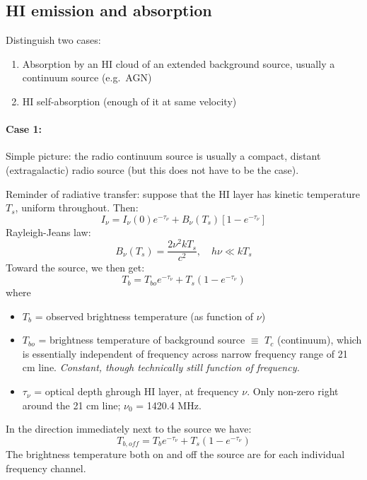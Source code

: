 \documentclass[12pt]{article}
\newcommand{\mar}[1]{\hspace{0pt}\marginpar{-\textcolor{black}{#1}-}}
\newcommand{\mynotes}[1]{{\fontfamily{cmss}\selectfont \textit{#1}}}
\begin{document}
\subsection{HI emission and absorption}
\mar{41}Distinguish two cases:
\begin{enumerate}
    \item Absorption by an HI cloud of an extended background source, usually
        a continuum source (e.g.\ AGN)
    \item HI self-absorption (enough of it at same velocity)
\end{enumerate}
\paragraph{Case 1:}
Simple picture: the radio continuum source is usually a compact, distant
(extragalactic) radio source (but this does not have to be the case).

Reminder of radiative transfer: suppose that the HI layer has kinetic
temperature $T_{s}$, uniform throughout. Then:
\[
    I_{\nu} = I_{\nu}(0)e^{-\tau_{\nu}}
    + B_{\nu} (T_{s}) \left[ 1 - e^{-\tau_{\nu}} \right]
    \]
Rayleigh-Jeans law:
\[
    B_{\nu} (T_{s}) = \frac{2\nu^{2}kT_{s}}{c^{2}}, \quad h\nu \ll kT_{s}
    \]
Toward the source, we then get:
\[
    T_{b} = T_{bo} e^{-\tau_{\nu}} + T_{s} \left( 1 - e^{-\tau_{\nu}} \right)
    \]
where
\begin{itemize}
    \item $T_{b}$ = observed brightness temperature (as function of $\nu$)
    \item $T_{bo}$ = brightness temperature of background source $\equiv$ $T_{c}$
        (continuum), which is essentially independent of frequency across narrow
        frequency range of 21 cm line. \mynotes{Constant, though technically still
        function of frequency.}
    \item $\tau_{\nu}$ = optical depth ghrough HI layer, at frequency $\nu$.
        Only non-zero right around the 21 cm line; $\nu_{0}$ = 1420.4 MHz.
\end{itemize}

\mar{42}In the direction immediately next to the source we have:
\[
    T_{b, off} = T_{b} e^{-\tau_{\nu}} + T_{s} \left( 1 - e^{-\tau_{\nu}} \right)
    \]
The brightness temperature both on and off the source are for each
individual frequency channel.
\end{document}
